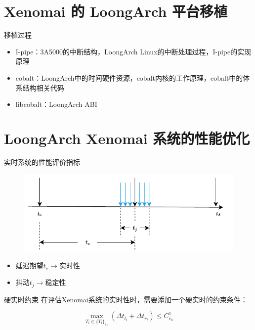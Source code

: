 \documentclass{beamer}
\begin{document}
\section{Xenomai 的 LoongArch 平台移植}

\begin{frame}{移植过程}
    \begin{itemize}
        \item I-pipe：3A5000的中断结构，LoongArch Linux的中断处理过程，I-pipe的实现原理
        \item cobalt：LoongArch中的时间硬件资源，cobalt内核的工作原理，cobalt中的体系结构相关代码
        \item libcobalt：LoongArch ABI
    \end{itemize}
\end{frame}

\section{LoongArch Xenomai 系统的性能优化}

\begin{frame}{实时系统的性能评价指标}
    \begin{figure}[!htbp]
        \includegraphics[width=\textwidth]{img/Img/jitter.pdf}
      \end{figure}
    \begin{itemize}
        \item 延迟期望$t_e\to$实时性
        \item 抖动$t_j\to$稳定性
    \end{itemize}
\end{frame}

\begin{frame}{硬实时约束}
在评估Xenomai系统的实时性时，需要添加一个硬实时的约束条件：

$$\max_{T_i\in\{T_i\}_{e_k}}{(\Delta t_{l_i} + \Delta t_{r_i})} \le C_{e_{k}}^1$$
\end{frame}
\end{document}
